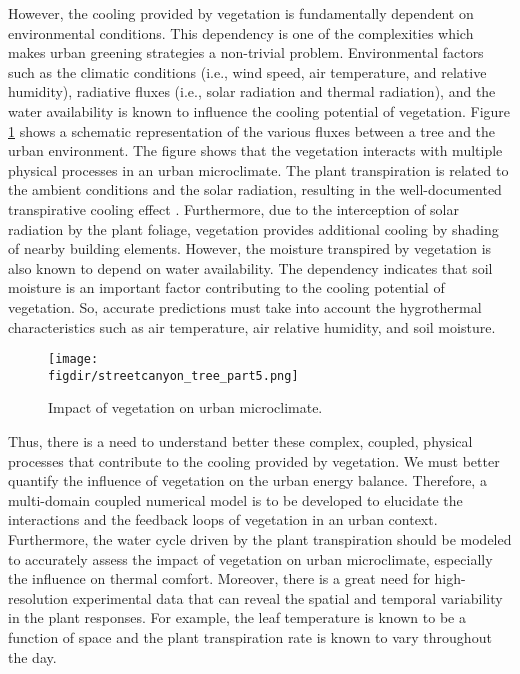 However, the cooling provided by vegetation is fundamentally dependent on environmental conditions. This dependency is one of the complexities which makes urban greening strategies a non-trivial problem. Environmental factors such as the climatic conditions (i.e., wind speed, air temperature, and relative humidity), radiative fluxes (i.e., solar radiation and thermal radiation), and the water availability is known to influence the cooling potential of vegetation. Figure \ref{fig:vegetation_fluxes} shows a schematic representation of the various fluxes between a tree and the urban environment. The figure shows that the vegetation interacts with multiple physical processes in an urban microclimate. The plant transpiration is related to the ambient conditions and the solar radiation, resulting in the well-documented transpirative cooling effect \citep{Oke2017a,Farquhar2007,abtew2012evaporation,Melesse2008}. Furthermore, due to the interception of solar radiation by the plant foliage, vegetation provides additional cooling by shading of nearby building elements. However, the moisture transpired by vegetation is also known to depend on water availability. The dependency indicates that soil moisture is an important factor contributing to the cooling potential of vegetation. So, accurate predictions must take into account the hygrothermal characteristics such as air temperature, air relative humidity, and soil moisture.

\begin{figure}[t]
	\centering
	\texttt{[image: \\figdir/streetcanyon\_tree\_part5.png]}
	\caption{Impact of vegetation on urban microclimate.}
	\label{fig:vegetation_fluxes}
\end{figure}

Thus, there is a need to understand better these complex, coupled, physical processes that contribute to the cooling provided by vegetation. We must better quantify the influence of vegetation on the urban energy balance. Therefore, a multi-domain coupled numerical model is to be developed to elucidate the interactions and the feedback loops of vegetation in an urban context. Furthermore, the water cycle driven by the plant transpiration should be modeled to accurately assess the impact of vegetation on urban microclimate, especially the influence on thermal comfort. Moreover, there is a great need for high-resolution experimental data that can reveal the spatial and temporal variability in the plant responses. For example, the leaf temperature is known to be a function of space and the plant transpiration rate is known to vary throughout the day.

